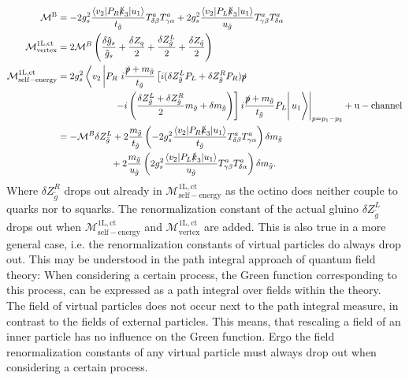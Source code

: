 \begin{align}
\mathcal{M}^{\mathrm{B}} &= -2g_s^2 \frac{\left\langle v_2 |P_R \slashed{k}_3|u_1\right\rangle}{t_{\tilde{g}}} T^a_{\delta \beta} T^a_{\gamma \alpha} + 2g_s^2 \frac{\left\langle v_2 |P_L \slashed{k}_3|u_1\right\rangle}{u_{\tilde{g}}} T^a_{\gamma\beta} T^a_{\delta\alpha}\\
\mathcal{M}^{\mathrm{1L,ct}}_{\mathrm{vertex}} &= 2 \mathcal{M}^B  \left( \frac{\delta \hat{g}_s}{\hat{g}_s} + \frac{\delta Z_q}{2} + \frac{\delta Z^L_{\tilde{g}}}{2} + \frac{\delta Z_{\tilde{q}}}{2} \right)\\
\mathcal{M}^{\mathrm{1L,ct}}_{\mathrm{self-energy}} &= 2g_s^2 \left\langle v_2 \left| P_R\ i\frac{\slashed{p}+m_{\tilde{g}}}{t_{\tilde{g}}} \left[  i(\delta Z_{\tilde{g}}^L P_L + \delta Z_{\tilde{g}}^R P_R)\slashed{p}  \right.\right.\right.\nonumber\\
& \hspace{2cm}\left.\left.\left.\left. -i\left( \frac{\delta Z_{\tilde{g}}^L + \delta Z_{\tilde{g}}^R}{2}m_{\tilde{g}} + \delta m_{\tilde{g}} \right) \right]i\frac{\slashed{p}+m_{\tilde{g}}}{t_{\tilde{g}}} P_L \right|u_1\right\rangle\right|_{p = p_1-p_3} + \mathrm{u-channel}\nonumber\\
&= -\mathcal{M}^B  \delta Z_{\tilde{g}}^L + 2  \frac{ m_{\tilde{g}}}{t_{\tilde{g}}} \left( -2g_s^2 \frac{\left\langle v_2 |P_R \slashed{k}_3|u_1\right\rangle}{t_{\tilde{g}}} T^a_{\delta \beta} T^a_{\gamma \alpha} \right)\delta m_{\tilde{g}}\nonumber\\ 
& \hspace{2cm}+ 2 \frac{ m_{\tilde{g}}}{u_{\tilde{g}}} \left( 2g_s^2 \frac{\left\langle v_2 |P_L \slashed{k}_3|u_1\right\rangle}{u_{\tilde{g}}} T^a_{\gamma\beta} T^a_{\delta\alpha} \right)\delta m_{\tilde{g}}.
\end{align}
Where $\delta Z^R_{\tilde{g}}$ drops out already in $\mathcal{M}^{\mathrm{1L,ct}}_{\mathrm{self-energy}}$ as the octino does neither couple to quarks nor to squarks. The renormalization constant of the actual gluino $\delta Z^L_{\tilde{g}}$ drops out when $\mathcal{M}^{\mathrm{1L,ct}}_{\mathrm{self-energy}}$ and $\mathcal{M}^{\mathrm{1L,ct}}_{\mathrm{vertex}}$ are added. This is also true in a more general case, i.e. the renormalization constants of virtual particles do always drop out. This may be understood in the path integral approach of quantum field theory\cite{Peskin}: When considering a certain process, the Green function corresponding to this process, can be expressed as a path integral over fields within the theory. The field of virtual particles does not occur next to the path integral measure, in contrast to the fields of external particles. This means, that rescaling a field of an inner particle has no influence on the Green function. Ergo the field renormalization constants of any virtual particle must always drop out when considering a certain process.
